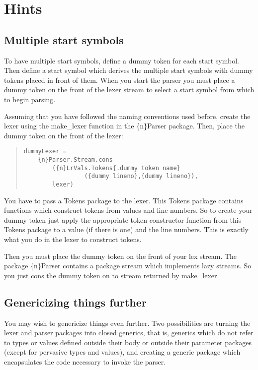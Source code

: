 \section{Hints}
\subsection{Multiple start symbols}
To have multiple start symbols, define a dummy token for each
start symbol.  Then define a start symbol which derives the
multiple start symbols with dummy tokens placed in front of
them.  When you start the parser you must place a dummy token
on the front of the lexer stream to select a start symbol
from which to begin parsing.

Assuming that you have followed the naming conventions used before,
create the lexer using the make_lexer function in the \{n\}Parser package.
Then, place the dummy token on the front of the lexer:
\begin{quote}
\begin{verbatim}
dummyLexer =
    {n}Parser.Stream.cons
        ({n}LrVals.Tokens{.dummy token name}
                 ({dummy lineno},{dummy lineno}),
        lexer)
\end{verbatim}
\end{quote}
You have to pass a Tokens package to the lexer.  This Tokens package
contains functions which construct tokens from values and line numbers.
So to create your dummy token just apply the appropriate token constructor
function from this Tokens package to a value (if there is one) and the
line numbers.   This is exactly what you do in the lexer to construct tokens.

Then you must place the dummy token on the front of your lex stream.
The package \{n\}Parser contains a package stream which implements
lazy streams.  So you just cons the dummy token on to stream returned
by make_lexer.
\subsection{Genericizing things further}

You may wish to genericize things even further.  Two possibilities
are turning the lexer and parser packages into closed generics,
that is, generics which do not refer to types or values defined
outside their body or outside their parameter packages (except
for pervasive types and values), and creating a generic package which
encapsulates the code necessary to invoke the parser.

